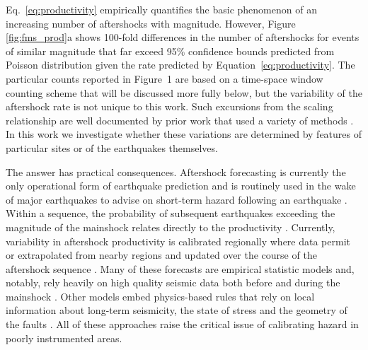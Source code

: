 \documentclass[draft, jgrga]{agujournal2018}
\begin{document}
Eq.~\ref{eq:productivity} empirically quantifies the basic phenomenon of an increasing number of aftershocks with magnitude. However, Figure \ref{fig:fms_prod}a shows 100-fold differences in the number of aftershocks for events of similar magnitude that far exceed 95\% confidence bounds predicted from Poisson distribution given the rate predicted by Equation~\ref{eq:productivity}. The particular counts reported in Figure~1 are based on a time-space window counting scheme that will be discussed more fully below, but the variability of the aftershock rate is not unique to this work. Such excursions from the scaling relationship are  well documented by prior work that used a variety of methods \citep[e.g.][]{Marsan2017HowAftershocks,Boettcher2004EarthquakeFaults,Page,Tahir2014Aftershock2005}. In this work we investigate whether these variations are determined by features of particular sites or of the earthquakes themselves.

The answer has practical consequences. Aftershock forecasting is currently the only operational form of earthquake prediction and is routinely used in the wake of major earthquakes to advise on short-term hazard following an earthquake \citep{Reasenberg1989, Page,Hardebeck2018UpdatedParameters}. Within a sequence, the probability of subsequent earthquakes exceeding the magnitude of the mainshock relates directly to the productivity \citep{Reasenberg1989, Reasenberg1999ForeshockEarthquakes}. Currently, variability in aftershock productivity is calibrated regionally where data permit or extrapolated from nearby regions and updated over the course of the aftershock sequence \citep[e.g.][]{Reasenberg1989, Reasenberg1999ForeshockEarthquakes, ogata2017statistics}. Many of these forecasts are empirical statistic models and, notably, rely heavily on high quality seismic data both before and during the mainshock \citep{Gerstenberger2005Real-timeCalifornia, Omi2015Intermediate-termApproaches}. Other models embed physics-based rules that rely on local information about long-term seismicity, the state of stress and the geometry of the faults \citep[e.g.][]{Segou2016ProspectiveMainshock, Field2017AForecast}. All of these approaches raise the critical issue of calibrating hazard in poorly instrumented areas.
\end{document}
